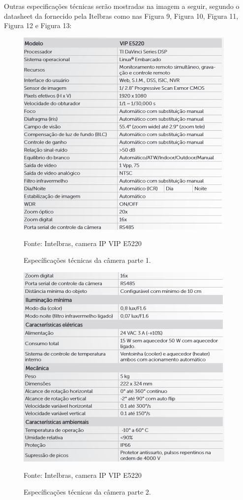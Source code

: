 \begin{itemize}
\begin{itemize}
	Outras especificações técnicas serão mostradas na imagem a seguir, segundo o datasheet da fornecido pela Itelbras como nas Figura 9,  Figura 10,  Figura 11,   Figura 12 e Figura 13:
	
	\begin{figure}[H]
	 \centering
	\label{Específicações técnicas da câmera parte 1}
	 \includegraphics[keepaspectratio=true,scale=0.8]{monitoramento/9.png}
	 \caption{Específicações técnicas da câmera parte 1.}
	 \small{Fonte: Intelbras, camera IP VIP E5220}
	\end{figure}
	
	\begin{figure}[H]
	 \centering
	\label{Específicações técnicas da câmera parte 2}
	 \includegraphics[keepaspectratio=true,scale=0.8]{monitoramento/10.png}
	 \caption{Específicações técnicas da câmera parte 2.}
	 \small{Fonte: Intelbras, camera IP VIP E5220}
	\end{figure}
	

\end{itemize}
\end{itemize}
